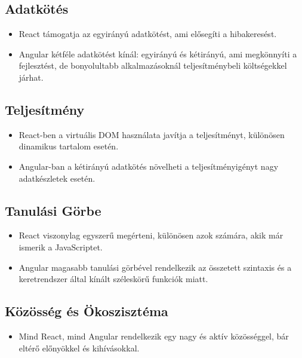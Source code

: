 \subsection*{Adatkötés}
\begin{itemize}
  \item React támogatja az egyirányú adatkötést, ami elősegíti a hibakeresést.
  \item Angular kétféle adatkötést kínál: egyirányú és kétirányú, ami megkönnyíti a fejlesztést, de bonyolultabb alkalmazásoknál teljesítménybeli költségekkel járhat.
\end{itemize}
\subsection*{Teljesítmény}
\begin{itemize}
  \item React-ben a virtuális DOM használata javítja a teljesítményt, különösen dinamikus tartalom esetén.
  \item Angular-ban a kétirányú adatkötés növelheti a teljesítményigényt nagy adatkészletek esetén.
\end{itemize}
\subsection*{Tanulási Görbe}
\begin{itemize}
  \item React viszonylag egyszerű megérteni, különösen azok számára, akik már ismerik a JavaScriptet.
  \item Angular magasabb tanulási görbével rendelkezik az összetett szintaxis és a keretrendszer által kínált széleskörű funkciók miatt.
\end{itemize}
\subsection*{Közösség és Ökoszisztéma}
\begin{itemize}
  \item Mind React, mind Angular rendelkezik egy nagy és aktív közösséggel, bár eltérő előnyökkel és kihívásokkal.
\end{itemize}

